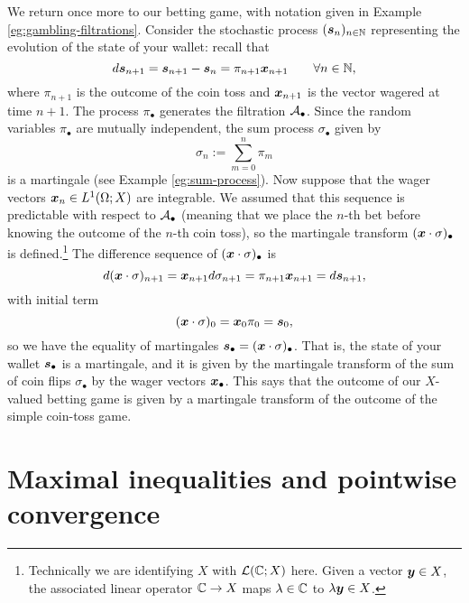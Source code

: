 \begin{example}\label{eg:betting-game-martingale}
  We return once more to our betting game, with notation given in Example \ref{eg:gambling-filtrations}.
  Consider the stochastic process $(\bm{s}_n)_{n \in \mathbb{N}}$ representing the evolution of the state of your wallet: recall that
  \begin{equation*}
    d\bm{s}_{n+1} = \bm{s}_{n+1} - \bm{s}_{n} = \pi_{n+1} \bm{x}_{n+1} \qquad \forall n \in \mathbb{N},
  \end{equation*}
  where $\pi_{n+1}$ is the outcome of the coin toss and $\bm{x}_{n+1}$ is the vector wagered at time $n+1$.
  The process $\pi_{\bullet}$ generates the filtration $\mathcal{A}_{\bullet}$.
  Since the random variables $\pi_{\bullet}$ are mutually independent, the sum process $\sigma_{\bullet}$ given by
  \begin{equation*}
    \sigma_{n} := \sum_{m=0}^n \pi_{m}
  \end{equation*}
  is a martingale (see Example \ref{eg:sum-process}).
  Now suppose that the wager vectors $\bm{x}_n \in L^1(\Omega;X)$ are integrable.
  We assumed that this sequence is predictable with respect to $\mathcal{A}_{\bullet}$ (meaning that we place the $n$-th bet before knowing the outcome of the $n$-th coin toss), so the martingale transform $(\bm{x} \cdot \sigma)_{\bullet}$ is defined.\footnote{Technically we are identifying $X$ with $\mathcal{L}(\mathbb{C};X)$ here. Given a vector $\bm{y} \in X$, the associated linear operator $\mathbb{C} \to X$ maps $\lambda \in \mathbb{C}$ to $\lambda \bm{y} \in X$.}
  The difference sequence of $(\bm{x} \cdot \sigma)_{\bullet}$ is
  \begin{equation*}
    d(\bm{x} \cdot \sigma)_{n+1} = \bm{x}_{n+1} d\sigma_{n+1} = \pi_{n+1} \bm{x}_{n+1} = d\bm{s}_{n+1}, 
  \end{equation*}
  with initial term
  \begin{equation*}
    (\bm{x} \cdot \sigma)_0 = \bm{x}_{0} \pi_{0} = \bm{s}_{0},
  \end{equation*}
  so we have the equality of martingales $\bm{s}_{\bullet} = (\bm{x} \cdot \sigma)_{\bullet}$.
  That is, the state of your wallet $\bm{s}_{\bullet}$ is a martingale, and it is given by the martingale transform of the sum of coin flips $\sigma_{\bullet}$ by the wager vectors $\bm{x}_{\bullet}$.
  This says that the outcome of our $X$-valued betting game is given by a martingale transform of the outcome of the simple coin-toss game.
\end{example}


\section{Maximal inequalities and pointwise convergence}

